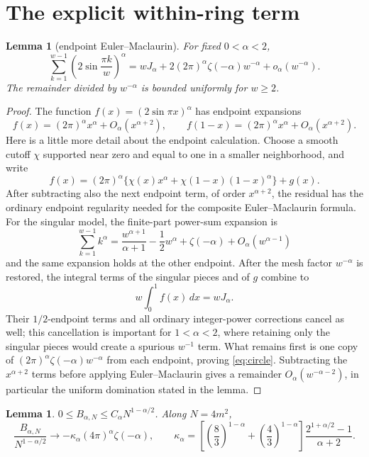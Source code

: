 \documentclass[11pt]{amsart}
\newtheorem{lemma}[theorem]{Lemma}
\begin{document}
\section{The explicit within-ring term}

\begin{lemma}[endpoint Euler--Maclaurin]\label{lem:circle}
For fixed $0<\alpha<2$,
\begin{equation}\label{eq:circle}
 \sum_{k=1}^{w-1}\left(2\sin\frac{\pi k}{w}\right)^\alpha
 =wJ_\alpha+2(2\pi)^\alpha\zeta(-\alpha)w^{-\alpha}
 +o_\alpha(w^{-\alpha}).                             \tag{3.1}
\end{equation}
The remainder divided by $w^{-\alpha}$ is bounded uniformly for $w\ge2$.
\end{lemma}

\begin{proof}
The function $f(x)=(2\sin\pi x)^\alpha$ has endpoint expansions
\[
 f(x)=(2\pi)^\alpha x^\alpha+O_\alpha(x^{\alpha+2}),
 \qquad f(1-x)=(2\pi)^\alpha x^\alpha+O_\alpha(x^{\alpha+2}).
\]
Here is a little more detail about the endpoint calculation.  Choose a
smooth cutoff $\chi$ supported near zero and equal to one in a smaller
neighborhood, and write
\[
 f(x)=(2\pi)^\alpha\{\chi(x)x^\alpha+
 \chi(1-x)(1-x)^\alpha\}+g(x).
\]
After subtracting also the next endpoint term, of order
$x^{\alpha+2}$, the residual has the ordinary endpoint regularity needed
for the composite Euler--Maclaurin formula.  For the singular model, the
finite-part power-sum expansion is
\[
 \sum_{k=1}^{w-1}k^\alpha
 =\frac{w^{\alpha+1}}{\alpha+1}-\frac12w^\alpha
   +\zeta(-\alpha)+O_\alpha(w^{\alpha-1})
\]
and the same expansion holds at the other endpoint.  After the mesh factor
$w^{-\alpha}$ is restored, the integral terms of the singular pieces and of
$g$ combine to
\[
 w\int_0^1f(x)\,dx=wJ_\alpha.
\]
Their $1/2$-endpoint terms and all ordinary integer-power corrections cancel
as well; this cancellation is important for $1<\alpha<2$, where retaining
only the singular pieces would create a spurious $w^{-1}$ term.  What remains
first is one copy of $(2\pi)^\alpha\zeta(-\alpha)w^{-\alpha}$ from each
endpoint, proving \eqref{eq:circle}.  Subtracting the $x^{\alpha+2}$ terms
before applying Euler--Maclaurin gives a remainder
$O_\alpha(w^{-\alpha-2})$, in particular the uniform domination stated in
the lemma.
\end{proof}

\begin{lemma}\label{lem:within}
$0\le B_{\alpha,N}\le C_\alpha N^{1-\alpha/2}$.  Along $N=4m^2$,
\[
 \frac{B_{\alpha,N}}{N^{1-\alpha/2}}
 \longrightarrow
 -\kappa_\alpha(4\pi)^\alpha\zeta(-\alpha),
 \qquad
 \kappa_\alpha=
 \left[\left(\frac83\right)^{1-\alpha}
       +\left(\frac43\right)^{1-\alpha}\right]
 \frac{2^{1+\alpha/2}-1}{\alpha+2}.
\]
\end{lemma}
\end{document}
